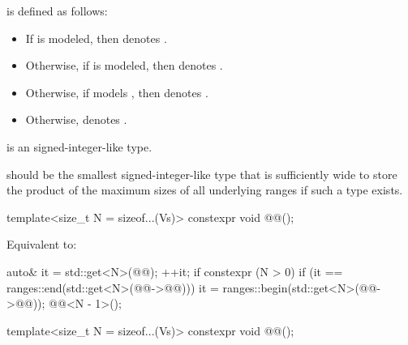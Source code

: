 \pnum
{} is defined as follows:
\begin{itemize}
\item
If 
is modeled,
then  denotes .
\item
Otherwise,
if 
is modeled,
then  denotes .
\item
Otherwise,
if  models ,
then  denotes .
\item
Otherwise,  denotes .
\end{itemize}

\pnum
{} is
an 
signed-integer-like type.

\pnum
\recommended
{} should be
the smallest signed-integer-like type
that is sufficiently wide to store
the product of the maximum sizes of all underlying ranges
if such a type exists.

%
\begin{itemdecl}
template<size_t N = sizeof...(Vs)>
  constexpr void @@();
\end{itemdecl}

\begin{itemdescr}
\pnum
\effects
Equivalent to:
\begin{codeblock}
auto& it = std::get<N>(@@);
++it;
if constexpr (N > 0) {
  if (it == ranges::end(std::get<N>(@@->@@))) {
    it = ranges::begin(std::get<N>(@@->@@));
    @@<N - 1>();
  }
}
\end{codeblock}
\end{itemdescr}

%
\begin{itemdecl}
template<size_t N = sizeof...(Vs)>
  constexpr void @@();
\end{itemdecl}

